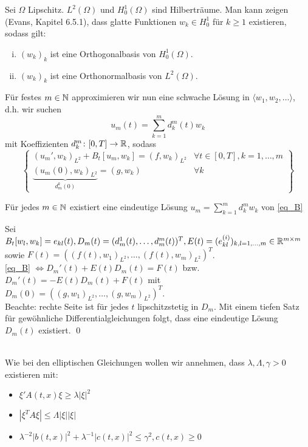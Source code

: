 \begin{defn}
Sei $\Omega$ Lipschitz. $L^2(\Omega)$ und $H_0^1(\Omega)$ sind Hilberträume. Man kann zeigen (Evans, Kapitel 6.5.1), dass glatte Funktionen $w_k \in H_0^1$ für $k \geq 1$ existieren, sodass gilt:
\begin{enumerate}[(i)]
	\item $(w_k)_k$ ist eine Orthogonalbasis von $H_0^1(\Omega)$.
	\item $(w_k)_k$ ist eine Orthonormalbasis von $L^2(\Omega)$.
\end{enumerate}
Für festes $m \in \mathbb{N}$ approximieren wir nun eine schwache Lösung in $\langle w_1,w_2,\dots \rangle$, d.h. wir suchen
\[ u_m(t) = \sum\limits_{k=1}^{m} d_k^m(t) w_k \]
mit Koeffizienten $d_k^m \colon [0,T] \rightarrow \mathbb{R}$, sodass
\begin{equation}
	\left. \begin{cases}
	(u_m',w_k)_{L^2} + B_t [u_m,w_k] = (f,w_k)_{L^2} & \forall t \in [0,T], k = 1,\dots,m \\ 
	\underbrace{(u_m(0),w_k)_{L^2}}_{d_m^k (0)} = (g,w_k) & \forall k
	\end{cases} \right\} \label{eq_B}
\end{equation}
\end{defn}

\begin{thm}
	Für jedes $m \in \mathbb{N}$ existiert eine eindeutige Lösung $u_m = \sum_{k=1}^{m} d_k^m w_k$ von \eqref{eq_B}
\end{thm}
	
	Sei $B_t[w_l,w_k] = e_{kl}(t), D_m(t) = (d_m^1(t), \dots, d_m^m(t))^T, E(t) = (e_{kl}^{(i)})_{k,l = 1,\dots,m} \in \mathbb{R}^{m \times m}$ sowie \linebreak
	$F(t) = ( (f(t),w_1)_{L^2},\dots,(f(t),w_m)_{L^2} )^T$. \\
	\eqref{eq_B} $\Leftrightarrow D_m'(t) + E(t) D_m(t) = F(t)$ bzw. $D_m'(t) = -E(t) D_m(t) + F(t)$ mit $D_m(0) = ( (g,w_1)_{L^2}, \dots, (g,w_m)_{L^2})^T$.\\
	Beachte: rechte Seite ist für jedes $t$ lipschitzstetig in $D_m$. Mit einem tiefen Satz für gewöhnliche Differentialgleichungen folgt, dass eine eindeutige Lösung $D_m(t)$ existiert. \qed
	
\mbox{} \\
Wie bei den elliptischen Gleichungen wollen wir annehmen, dass $\lambda, \Lambda, \gamma > 0$ existieren mit: \begin{itemize}
	\item $\xi' A(t,x) \xi \geq \lambda |\xi|^2$
	\item $| \xi^TA \xi| \leq \Lambda |\xi||\xi|$
	\item $\lambda^{-2} |b(t,x)|^2 + \lambda^{-1} |c(t,x)|^2 \leq \gamma^2, c(t,x) \geq 0$
\end{itemize}

